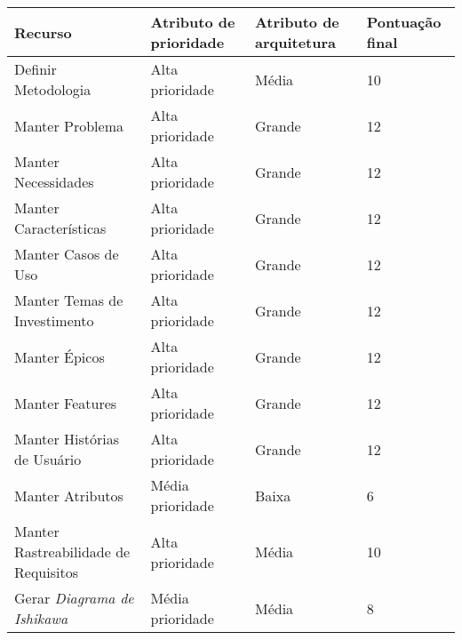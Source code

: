 \begin{table}[h]
\centering
\begin{tabular}{|l|C{3cm}|C{3cm}|l|}

\hline
\textbf{Recurso} &
\textbf{Atributo de prioridade} &
\small{\textbf{Atributo de arquitetura}} &
\textbf{Pontuação final}
\\ \hline

Definir Metodologia & 
Alta prioridade &
Média &
10
 \\ \hline

Manter Problema &
Alta prioridade &
Grande &
12
 \\ \hline
 
Manter Necessidades &
Alta prioridade &
Grande &
12
 \\ \hline
 
Manter Características &
Alta prioridade &
Grande &
12
 \\ \hline
 
Manter Casos de Uso &
Alta prioridade &
Grande &
12
 \\ \hline
 
Manter Temas de Investimento &
Alta prioridade &
Grande &
12
 \\ \hline
 
Manter Épicos &
Alta prioridade &
Grande &
12
 \\ \hline
 
Manter Features &
Alta prioridade &
Grande &
12
 \\ \hline
 
Manter Histórias de Usuário &
Alta prioridade &
Grande &
12
 \\ \hline
 
Manter Atributos &
Média prioridade &
Baixa &
6
 \\ \hline
 
Manter Rastreabilidade de Requisitos &
Alta prioridade &
Média &
10
 \\ \hline
 
Gerar \textit{Diagrama de Ishikawa} &
Média prioridade &
Média &
8
 \\ \hline
 

\end{tabular}
\end{table}
